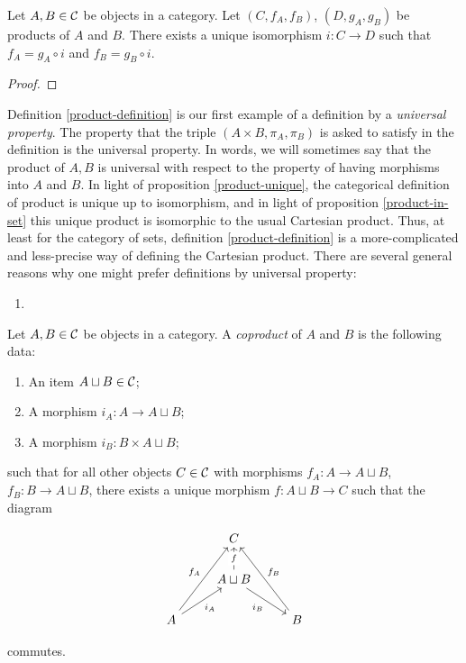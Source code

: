 \begin{prop}\label{product-unique} Let $A,B\in{\mathcal C}$ be objects in a category. Let $(C,f_A,f_B)$, $(D,g_A,g_B)$ be products of $A$ and $B$. There exists a unique isomorphism $i:C\to D$ such that $f_A= g_A\circ i$ and $f_B=g_B\circ i$.
\end{prop}
\begin{proof}
\end{proof}

\begin{rem} Definition \ref{product-definition} is our first example of a definition by a {\em universal property}. The property that the triple $(A\times B,\pi_A,\pi_B)$ is asked to satisfy in the definition is the universal property. In words, we will sometimes say that the product of $A,B$ is universal with respect to the property of having morphisms into $A$ and $B$. In light of proposition \ref{product-unique}, the categorical definition of product is unique up to isomorphism, and in light of proposition \ref{product-in-set} this unique product is isomorphic to the usual Cartesian product. Thus, at least for the category of sets, definition \ref{product-definition} is a more-complicated and less-precise way of defining the Cartesian product. There are several general reasons why one might prefer definitions by universal property:

\begin{enumerate}
\item {}
\end{enumerate}
\end{rem}

\begin{defn}[Coproduct]\label{coproduct-definition} Let $A,B\in {\mathcal C}$ be objects in a category. A {\em coproduct} of $A$ and $B$ is the following data:

\begin{enumerate}
\item An item $A\sqcup B\in {\mathcal C}$;
\item A morphism $i_A:A\to A\sqcup B$;
\item A morphism $i_B:B\times A\sqcup B$;
\end{enumerate}

such that for all other objects $C\in {\mathcal C}$ with morphisms $f_A:A\to A\sqcup B$, $f_B:B\to A\sqcup B$, there exists a unique morphism $f:A\sqcup B\to C$ such that the diagram

\[\begin{tikzcd}
	& C \\
	& {A\sqcup B} \\
	A && B
	\arrow["f"{description}, from=2-2, to=1-2]
	\arrow["{i_B}"', from=2-2, to=3-3]
	\arrow["{f_A}", from=3-1, to=1-2]
	\arrow["{i_A}"', from=3-1, to=2-2]
	\arrow["{f_B}"', from=3-3, to=1-2]
\end{tikzcd}\]

commutes.

\raggedleft\qedsymbol{}
\end{defn}

